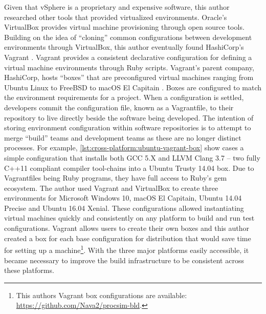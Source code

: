 Given that vSphere is a proprietary and expensive software, this author researched other tools that provided virtualized environments. Oracle's VirtualBox \cite{Oracle:VirtualBox} provides virtual machine provisioning through open source tools. Building on the idea of ``cloning'' common configurations between development environments through VirtualBox, this author eventually found HashiCorp's Vagrant \cite{VagrantUp}. Vagrant provides a consistent declarative configuration for defining a virtual machine environments through Ruby scripts. Vagrant's parent company, HashiCorp, hosts ``boxes'' that are preconfigured virtual machines ranging from Ubuntu Linux to FreeBSD to macOS El Capitain \cite{Vagrant:Boxes}. Boxes are configured to match the environment requirements for a project. When a configuration is settled, developers commit the configuration file, known as a Vagrantfile, to their repository to live directly beside the software being developed. The intention of storing environment configuration within software repositories is to attempt to merge ``build'' teams and development teams as these are no longer distinct processes. For example, \cref{lst:cross-platform:ubuntu-vagrant-box} show cases a simple configuration that installs both GCC 5.X and LLVM Clang \cite{LLVM:Clang} 3.7 -- two fully C++11 compliant compiler tool-chains into a Ubuntu Trusty 14.04 box. Due to Vagrantfiles being Ruby programs, they have full access to Ruby's gem ecosystem. The author used Vagrant and VirtualBox to create three environments for Microsoft Windows 10, macOS El Capitain, Ubuntu 14.04 Precise and Ubuntu 16.04 Xenial. These configurations allowed instantiating virtual machines quickly and consistently on any platform to build and run test configurations. Vagrant allows users to create their own boxes and this author created a box for each base configuration for distribution that would save time for setting up a machine\footnote{This authors Vagrant box configurations are available: \url{https://github.com/Nava2/procsim-bld}.}. With the three major platforms easily accessible, it became necessary to improve the build infrastructure to be consistent across these platforms.


